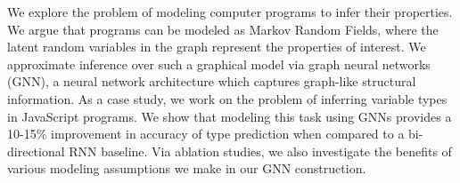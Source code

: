 We explore the problem of modeling computer programs to infer their properties.
We argue that programs can be modeled as Markov Random Fields, where the latent random variables in the graph represent the properties of interest.
We approximate inference over such a graphical model via graph neural networks (GNN), a neural network architecture which captures graph-like structural information.
As a case study, we work on the problem of inferring variable types in JavaScript programs.
We show that modeling this task using GNNs provides a 10-15\% improvement in accuracy of type prediction when compared to a bi-directional RNN baseline.
Via ablation studies, we also investigate the benefits of various modeling assumptions we make in our GNN construction.